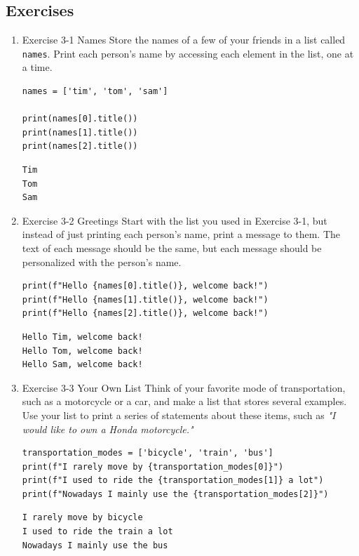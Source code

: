 \documentclass[10pt]{book}
\begin{document}
\subsection{Exercises}
\label{sec:org246cf0c}
\begin{enumerate}
\item Exercise 3-1 Names
\label{sec:org863bf9b}
Store the names of a few of your friends in a list called \texttt{names}. Print each person’s name by accessing each element in the list, one at a time.
\begin{verbatim}
names = ['tim', 'tom', 'sam']

print(names[0].title())
print(names[1].title())
print(names[2].title())
\end{verbatim}

\label{orge3173e6}
\begin{verbatim}
Tim
Tom
Sam
\end{verbatim}
\item Exercise 3-2 Greetings
\label{sec:orgedf5bdd}
Start with the list you used in Exercise 3-1, but instead of just printing each person’s name, print a message to them. The text of each message should be the same, but each message should be personalized with the person’s name.
\begin{verbatim}
print(f"Hello {names[0].title()}, welcome back!")
print(f"Hello {names[1].title()}, welcome back!")
print(f"Hello {names[2].title()}, welcome back!")
\end{verbatim}

\label{org071d746}
\begin{verbatim}
Hello Tim, welcome back!
Hello Tom, welcome back!
Hello Sam, welcome back!
\end{verbatim}
\item Exercise 3-3 Your Own List
\label{sec:orga7d187f}
Think of your favorite mode of transportation, such as a motorcycle or a car, and make a list that stores several examples. Use your list to print a series of statements about these items, such as \emph{"I would like to own a Honda motorcycle."}
\begin{verbatim}
transportation_modes = ['bicycle', 'train', 'bus']
print(f"I rarely move by {transportation_modes[0]}")
print(f"I used to ride the {transportation_modes[1]} a lot")
print(f"Nowadays I mainly use the {transportation_modes[2]}")
\end{verbatim}

\label{org80f34f5}
\begin{verbatim}
I rarely move by bicycle
I used to ride the train a lot
Nowadays I mainly use the bus
\end{verbatim}
\end{enumerate}
\end{document}
